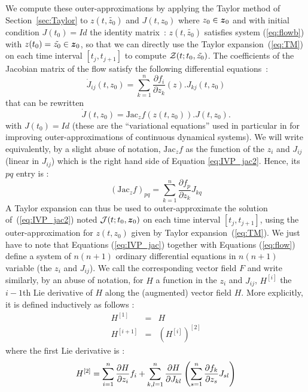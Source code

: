 \documentclass{sig-alternate-05-2015} %
\begin{document}
We compute these outer-approximations by applying the Taylor method of Section~\ref{sec:Taylor} to  $z(t,\tilde{z_0})$ 
and $J(t,z_0)$ where $z_0 \in \z_0$ and with initial condition $J(t_0)=Id$ the identity matrix~: $z(t,\tilde{z_0})$ satisfies system  (\ref{eq:flowb}) with $z(t_0)=\tilde{z_0}\in \z_0$, so that we can directly 
use the Taylor expansion~(\ref{eq:TM}) on each time interval $[t_j,t_{j+1}]$ to compute ${\cal Z}(t;t_0,\tilde{z_0})$. 
The coefficients of the Jacobian matrix of the flow satisfy the following differential equations~:
\begin{equation}
\dot{J}_{ij}(t,z_0) %
= \sum\limits_{k=1}^n \frac{\partial f_i}{\partial z_k}(z) . J_{kj}(t,z_0)
\label{eq:IVP_jac}
\end{equation} 
 that can be rewritten
\begin{equation}
\dot{J}(t,z_0) =  \mbox{Jac}_z f(z(t,z_0)) . J(t,z_0).
\label{eq:IVP_jac2}
\end{equation} 
with $J(t_0)=Id$ (these are the ``variational equations'' used in particular in \cite{Zgliczynski2002}
for improving outer-approximations of continuous dynamical systems).
We will write equivalently, by a slight abuse of notation, 
$\mbox{Jac}_z f$ as the function of the $z_i$ and $J_{ij}$ (linear in $J_{ij}$) which is
the right hand side of Equation \ref{eq:IVP_jac2}. Hence, its $pq$ entry is : 
\begin{equation}
(\mbox{Jac}_z f)_{pq} = \sum\limits_{k=1}^n \frac{\partial f_p}{\partial z_k} J_{kq}
\label{pqentry}
\end{equation}
A Taylor expansion can thus be used to outer-approximate the solution of~(\ref{eq:IVP_jac2}) noted ${\cal J}(t;t_0,\z_0)$ on each time interval  $[t_j,t_{j+1}]$, 
using the outer-approximation for $z(t,z_0)$ given by Taylor expansion~(\ref{eq:TM}).
We just have to note that Equations (\ref{eq:IVP_jac}) together with Equations
(\ref{eq:flow}) define a system of $n(n+1)$ ordinary differential equations in $n(n+1)$
variable (the $z_i$ and $J_{ij}$). We call the corresponding vector field $F$ and
write similarly, by an abuse of notation, for $H$ a function in the $z_i$ and $J_{ij}$,
$H^{[i]}$ the $i-1$th Lie derivative of $H$ along the (augmented) vector field $H$. More
explicitly, it is defined inductively as follows : 
\begin{eqnarray}
H^{[1]} & = & H \\ 
H^{[i+1]} & = & (H^{[i]})^{[2]}
\end{eqnarray}
\noindent where the first Lie derivative is :
\begin{equation}
H^{[2]} = 
\sum\limits_{i=1}^n \frac{\partial H}{\partial z_i} f_i \\
+\sum\limits_{k,l=1}^n \frac{\partial H}{\partial J_{kl}} \left(
\sum\limits_{s=1}^n \frac{\partial f_k}{\partial z_s} J_{sl}\right)
\label{eqfirstH}
\end{equation}
\end{document}
